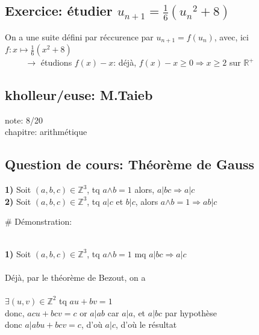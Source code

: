 \documentclass{article}
\begin{document}
\subsection{Exercice: étudier $u_{n+1} = \frac{1}{6} \left({u_n}^2 + 8 \right)$ }
\vspace{0.4cm}

On a une suite défini par réccurence par $u_{n+1} = f( u_n )$, avec, ici $f: x \mapsto \frac{1}{6} \left(x^2 + 8 \right)$ \\

$\hspace{1cm} \rightarrow$ étudions $f(x) - x$: déjà, $f(x) - x \geqslant 0 \Rightarrow x \geqslant 2$ sur $\mathbb{R}^+$

\subsection{kholleur/euse: M.Taieb}

note: 8/20 \\
chapitre: arithmétique

\subsection{Question de cours: Théorème de Gauss}

\textbf{1)} Soit $(a,b,c) \in \mathbb{Z}^3$, tq $a${\fontsize{1}{1}\selectfont $\land$}$b = 1$ alors, $a | bc \Rightarrow a | c$\\
\textbf{2)} Soit $(a,b,c) \in \mathbb{Z}^3$, tq $a|c$ et $b|c$, alors $a${\fontsize{1}{1}\selectfont $\land$}$b = 1 \Rightarrow ab | c$

\vspace{0.4cm}
$\#$ Démonstration: \\ \\
\vspace{0.2cm}

\textbf{1)} Soit $(a,b,c) \in \mathbb{Z}^3$, tq $a${\fontsize{1}{1}\selectfont $\land$}$b = 1$ mq $a | bc \Rightarrow a | c$\\ \\
Déjà, par le théorème de Bezout, on a \\ \\
$\exists (u,v) \in \mathbb{Z}^2$ tq $au + bv = 1 $ \\
donc, $acu + bcv = c$ or $a|ab$ car $a|a$, et $a|bc$ par hypothèse \\
donc $a|abu + bcv = c$, d'où $a|c$, d'où le résultat \\ \\
\end{document}
